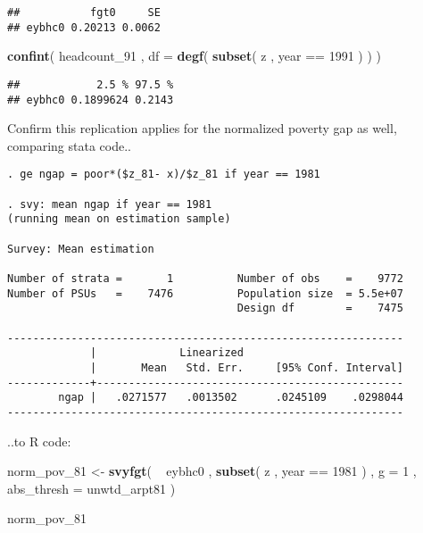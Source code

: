 \documentclass[]{book}
\newenvironment{Shaded}{\begin{snugshade}}{\end{snugshade}}
\newcommand{\KeywordTok}[1]{\textcolor[rgb]{0.13,0.29,0.53}{\textbf{{#1}}}}
\newcommand{\DataTypeTok}[1]{\textcolor[rgb]{0.13,0.29,0.53}{{#1}}}
\newcommand{\DecValTok}[1]{\textcolor[rgb]{0.00,0.00,0.81}{{#1}}}
\newcommand{\StringTok}[1]{\textcolor[rgb]{0.31,0.60,0.02}{{#1}}}
\newcommand{\NormalTok}[1]{{#1}}
\begin{document}
\begin{verbatim}
##           fgt0     SE
## eybhc0 0.20213 0.0062
\end{verbatim}

\begin{Shaded}
\begin{Highlighting}[]
\KeywordTok{confint}\NormalTok{( headcount_91 , }\DataTypeTok{df =} \KeywordTok{degf}\NormalTok{( }\KeywordTok{subset}\NormalTok{( z , year ==}\StringTok{ }\DecValTok{1991} \NormalTok{) ) )}
\end{Highlighting}
\end{Shaded}

\begin{verbatim}
##            2.5 % 97.5 %
## eybhc0 0.1899624 0.2143
\end{verbatim}

Confirm this replication applies for the normalized poverty gap as well,
comparing stata code..

\begin{verbatim}
. ge ngap = poor*($z_81- x)/$z_81 if year == 1981

. svy: mean ngap if year == 1981
(running mean on estimation sample)

Survey: Mean estimation

Number of strata =       1          Number of obs    =    9772
Number of PSUs   =    7476          Population size  = 5.5e+07
                                    Design df        =    7475

--------------------------------------------------------------
             |             Linearized
             |       Mean   Std. Err.     [95% Conf. Interval]
-------------+------------------------------------------------
        ngap |   .0271577   .0013502      .0245109    .0298044
--------------------------------------------------------------
\end{verbatim}

..to R code:

\begin{Shaded}
\begin{Highlighting}[]
\NormalTok{norm_pov_81 <-}\StringTok{ }
\StringTok{    }\KeywordTok{svyfgt}\NormalTok{( }
        \NormalTok{~}\StringTok{ }\NormalTok{eybhc0 , }
        \KeywordTok{subset}\NormalTok{( z , year ==}\StringTok{ }\DecValTok{1981} \NormalTok{) , }
        \DataTypeTok{g =} \DecValTok{1} \NormalTok{, }
        \DataTypeTok{abs_thresh =} \NormalTok{unwtd_arpt81}
    \NormalTok{)}
    
\NormalTok{norm_pov_81}
\end{Highlighting}
\end{Shaded}
\end{document}
